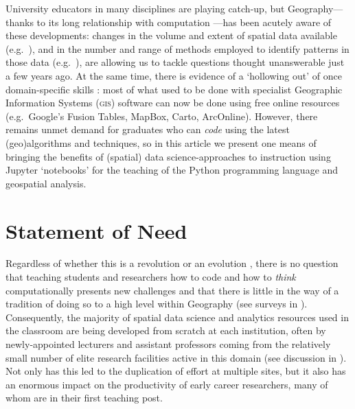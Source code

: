 \documentclass[letter, 11pt,titlepage]{article}
\newcommand{\eg}{e.g.~\/}
\begin{document}
University educators in many disciplines are playing catch-up, but Geography---thanks to its long relationship with computation \citep{ArribasBel2018}---has been acutely aware of these developments: changes in the volume and extent of spatial data available (\eg \citealp{Graham2013,gonzalez2013big,reades2016}), and in the number and range of methods employed to identify patterns in those data (\eg \citealp{Fan2016,Naik2017,Santibanez2015,Stevens2015,ArribasBel2017}), are allowing us to tackle questions thought unanswerable just a few years ago. At the same time, there is evidence of a `hollowing out' of once domain-specific skills \citep{Singleton2014,Singleton2016}: most of what used to be done with specialist Geographic Information Systems (\textsc{gis}) software can now be done using free online resources (\eg Google's Fusion Tables, MapBox, Carto, ArcOnline). However, there remains unmet demand for graduates who can \emph{code} using the latest (geo)algorithms and techniques, so in this article we present one means of bringing the benefits of (spatial) data science-approaches to instruction using Jupyter `notebooks' for the teaching of the Python programming language and geospatial analysis.

\section{Statement of Need}

Regardless of whether this is a revolution \citep{Wyly2014,Torrens2010} or an evolution \citep{Barnes2013,Barnes2014}, there is no question that teaching students and researchers how to code and how to \emph{think} computationally presents new challenges \citep{Etherington2016,Muller2014,rey_09jgs} and that there is little in the way of a tradition of doing so to a high level within Geography (see surveys in \citealp{Bowlick2017,Bowlick2018}). Consequently, the majority of spatial data science and analytics resources used in the classroom are being developed from scratch at each institution, often by newly-appointed lecturers and assistant professors coming from the relatively small number of elite research facilities active in this domain (see discussion in \citealp{esrc2013}). Not only has this led to the duplication of effort at multiple sites, but it also has an enormous impact on the productivity of early career researchers, many of whom are in their first teaching post.
\end{document}
